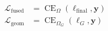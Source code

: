 \documentclass[border=3pt]{standalone}
\begin{document}
\color{ink}\fontsize{24}{32}\selectfont
$\displaystyle \begin{aligned}\mathcal L_{\mathrm{fused}}&=\operatorname{CE}_{\Omega}(\boldsymbol\ell_{\mathrm{final}},\mathbf y)\\\mathcal L_{\mathrm{geom}}&=\operatorname{CE}_{\Omega_G}(\boldsymbol\ell_G,\mathbf y)\end{aligned}$
\end{document}
